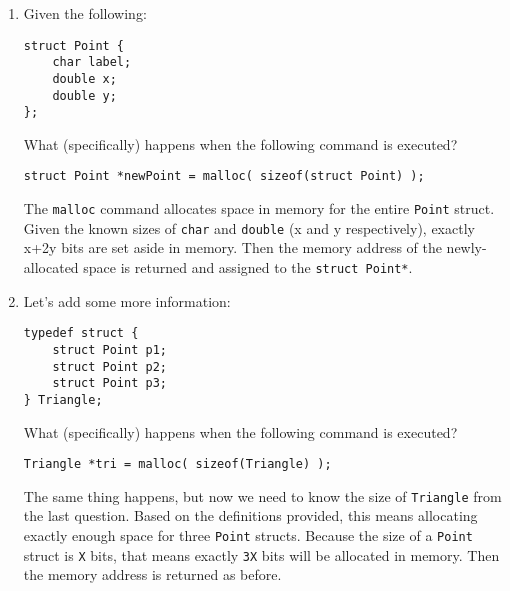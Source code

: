 \begin{enumerate}
\item Given the following:
\begin{lstlisting}[numbers=none]
struct Point {
	char label;
	double x;
	double y;
};
\end{lstlisting}

What (specifically) happens when the following command is executed?

\hspace{15mm} \texttt{struct Point *newPoint = malloc( sizeof(struct Point) );}

\begin{answer}
The \texttt{malloc} command allocates space in memory for the entire \texttt{Point} struct.
Given the known sizes of \texttt{char} and \texttt{double} (x and y respectively), exactly x+2y bits are set aside in memory.
Then the memory address of the newly-allocated space is returned and assigned to the \texttt{struct Point*}.
\end{answer}

\item Let's add some more information:
\begin{lstlisting}[numbers=none]
typedef struct {
	struct Point p1;
	struct Point p2;
	struct Point p3;
} Triangle;
\end{lstlisting}

What (specifically) happens when the following command is executed?

\hspace{15mm} \texttt{Triangle *tri = malloc( sizeof(Triangle) );}

\begin{answer}
The same thing happens, but now we need to know the size of \texttt{Triangle} from the last question.
Based on the definitions provided, this means allocating exactly enough space for three \texttt{Point} structs.
Because the size of a \texttt{Point} struct is \texttt{X} bits, that means exactly \texttt{3X} bits will be allocated in memory.
Then the memory address is returned as before.
\end{answer}
\end{enumerate}
